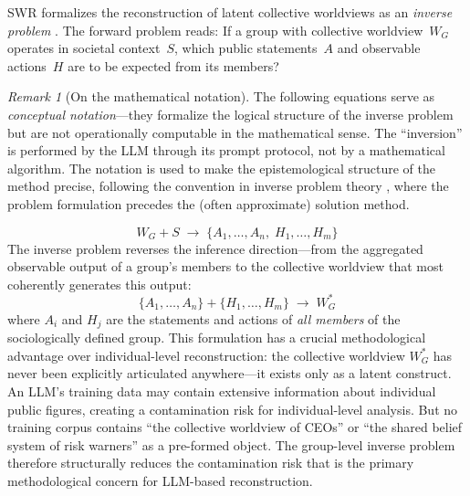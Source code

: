 \documentclass[11pt,a4paper]{article}
\theoremstyle{definition}
\theoremstyle{plain}
\theoremstyle{remark}
\newtheorem{remark}{Remark}[section]
\begin{document}
SWR formalizes the reconstruction of latent collective worldviews as an \emph{inverse problem} \citep{Tarantola2005}. The forward problem reads: If a group with collective worldview~$W_G$ operates in societal context~$S$, which public statements~$A$ and observable actions~$H$ are to be expected from its members?

\begin{remark}[On the mathematical notation]
The following equations serve as \emph{conceptual notation}---they formalize the logical structure of the inverse problem but are not operationally computable in the mathematical sense. The ``inversion'' is performed by the LLM through its prompt protocol, not by a mathematical algorithm. The notation is used to make the epistemological structure of the method precise, following the convention in inverse problem theory \citep{Tarantola2005}, where the problem formulation precedes the (often approximate) solution method.
\end{remark}

%
\begin{equation}
  W_G + S \;\longrightarrow\; \{A_1, \ldots, A_n,\; H_1, \ldots, H_m\}
  \label{eq:forward}
\end{equation}
%
The inverse problem reverses the inference direction---from the aggregated observable output of a group's members to the collective worldview that most coherently generates this output:
%
\begin{equation}
  \{A_1, \ldots, A_n\} + \{H_1, \ldots, H_m\} \;\longrightarrow\; W_G^*
  \label{eq:inverse}
\end{equation}
%
where $A_i$ and $H_j$ are the statements and actions of \emph{all members} of the sociologically defined group. This formulation has a crucial methodological advantage over individual-level reconstruction: the collective worldview $W_G^*$ has never been explicitly articulated anywhere---it exists only as a latent construct. An LLM's training data may contain extensive information about individual public figures, creating a contamination risk for individual-level analysis. But no training corpus contains ``the collective worldview of CEOs'' or ``the shared belief system of risk warners'' as a pre-formed object. The group-level inverse problem therefore structurally reduces the contamination risk that is the primary methodological concern for LLM-based reconstruction.
\end{document}

